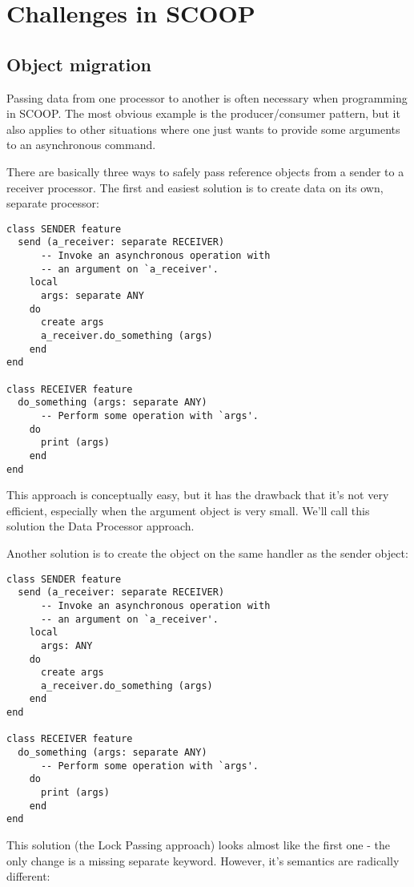 \documentclass[a4paper,10pt]{report}
\begin{document}
\section{Challenges in SCOOP}

\subsection{Object migration}

Passing data from one processor to another is often necessary when programming in SCOOP.
The most obvious example is the producer/consumer pattern, but it also applies to other situations where one just wants to provide some arguments to an asynchronous command.


There are basically three ways to safely pass reference objects from a sender to a receiver processor.
The first and easiest solution is to create data on its own, separate processor: 
\begin{lstlisting}
class SENDER feature
  send (a_receiver: separate RECEIVER)
      -- Invoke an asynchronous operation with
      -- an argument on `a_receiver'.
    local
      args: separate ANY
    do
      create args
      a_receiver.do_something (args)
    end
end

class RECEIVER feature 
  do_something (args: separate ANY)
      -- Perform some operation with `args'.
    do
      print (args)
    end
end
\end{lstlisting}
This approach is conceptually easy, but it has the drawback that it's not very efficient, especially when the argument object is very small.
We'll call this solution the Data Processor approach.

Another solution is to create the object on the same handler as the sender object:
\begin{lstlisting}
class SENDER feature
  send (a_receiver: separate RECEIVER)
      -- Invoke an asynchronous operation with
      -- an argument on `a_receiver'.
    local
      args: ANY
    do
      create args
      a_receiver.do_something (args)
    end
end

class RECEIVER feature 
  do_something (args: separate ANY)
      -- Perform some operation with `args'.
    do
      print (args)
    end
end
\end{lstlisting}
This solution (the Lock Passing approach) looks almost like the first one - the only change is a missing separate keyword.
However, it's semantics are radically different:
\end{document}
